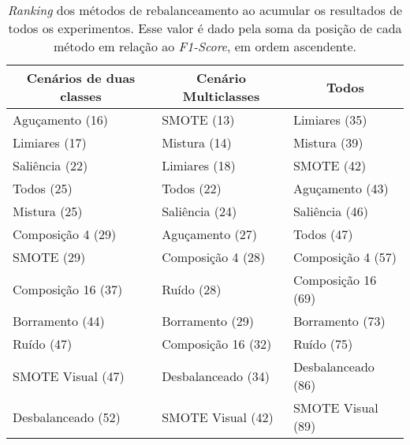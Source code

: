 \begin{table}[!htbp]
\centering
\caption{\textit{Ranking} dos métodos de rebalanceamento ao acumular os resultados de todos os experimentos. Esse valor é dado pela soma da posição de cada método em relação ao \textit{F1-Score}, em ordem ascendente.}
\label{tab:allranking}
\begin{tabular}{|l|l|l|}
\hline
\multicolumn{1}{|c|}{\textbf{Cenários de duas classes}} & \multicolumn{1}{c|}{\textbf{Cenário Multiclasses}} & \multicolumn{1}{c|}{\textbf{Todos}} \\ \hline
Aguçamento (16)                                         & SMOTE (13)                                         & Limiares (35)                       \\ \hline
Limiares (17)                                           & Mistura (14)                                       & Mistura (39)                        \\ \hline
Saliência (22)                                          & Limiares (18)                                      & SMOTE (42)                          \\ \hline
Todos (25)                                              & Todos (22)                                         & Aguçamento (43)                     \\ \hline
Mistura (25)                                            & Saliência (24)                                     & Saliência (46)                      \\ \hline
Composição 4 (29)                                       & Aguçamento (27)                                    & Todos (47)                          \\ \hline
SMOTE (29)                                              & Composição 4 (28)                                  & Composição 4 (57)                   \\ \hline
Composição 16 (37)                                      & Ruído (28)                                         & Composição 16 (69)                  \\ \hline
Borramento (44)                                         & Borramento (29)                                    & Borramento (73)                     \\ \hline
Ruído (47)                                              & Composição 16 (32)                                 & Ruído (75)                          \\ \hline
SMOTE Visual (47)                                       & Desbalanceado (34)                                 & Desbalanceado (86)                  \\ \hline
Desbalanceado (52)                                      & SMOTE Visual (42)                                  & SMOTE Visual (89)                   \\ \hline
\end{tabular}
\end{table}

